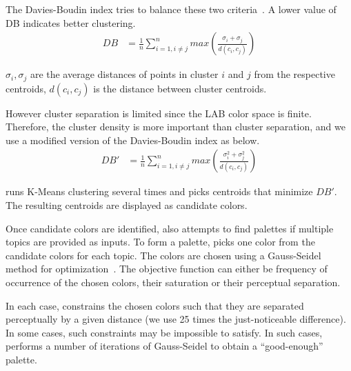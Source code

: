The Davies-Boudin index tries to balance these two criteria~\cite{davies1979cluster}.  A lower value of DB indicates better clustering.
\begin{align}
DB &= \frac{1}{n} \sum_{i=1, i \neq j}^{n}max\left(\frac{\sigma_{i} + \sigma_{j}}{d(c_{i}, c_{j})}\right)
\end{align}

$\sigma_{i}, \sigma_{j}$ are the average distances of points in cluster $i$ and $j$ from the respective centroids, $d(c_{i}, c_{j})$ is the distance between cluster centroids.

However  cluster separation is limited since the LAB color space is finite. Therefore, the cluster density is more important than cluster separation, and we use a modified version of the Davies-Boudin index as below.
\begin{align}
DB' &= \frac{1}{n} \sum_{i=1, i \neq j}^{n}max\left(\frac{\sigma_{i}^{2} + \sigma_{j}^{2}}{d(c_{i}, c_{j})}\right)
\end{align}

\system runs K-Means clustering several times and picks centroids that minimize $DB'$. The resulting centroids are displayed as candidate colors.

Once candidate colors are identified, \system also attempts to find palettes if multiple topics are provided as inputs. To form a palette, \system picks one color from the candidate colors for each topic. The colors are chosen using a Gauss-Seidel method for optimization~\cite{dwyer2009scalable}. The objective function can either be frequency of occurrence of the chosen colors, their saturation or their perceptual separation. 

In each case, \system constrains the chosen colors such that they are separated perceptually by a given distance (we use 25 times the just-noticeable difference). In some cases, such constraints may be impossible to satisfy. In such cases, \system performs a number of iterations of Gauss-Seidel to obtain a ``good-enough'' palette.